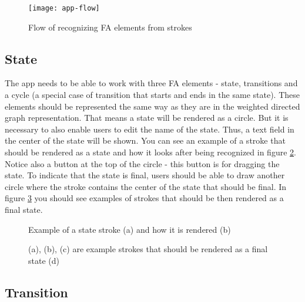 \begin{figure}
    \texttt{[image: app-flow]}
    \caption{Flow of recognizing FA elements from strokes}\label{app-flow}
\end{figure}

\subsection{State}

The app needs to be able to work with three FA elements - state, transitions and a cycle (a special case of transition that starts and ends in the same state). These elements should be represented the same way as they are in the weighted directed graph representation. That means a state will be rendered as a circle. But it is necessary to also enable users to edit the name of the state. Thus, a text field in the center of the state will be shown. You can see an example of a stroke that should be rendered as a state and how it looks after being recognized in figure \ref{state}. Notice also a button at the top of the circle - this button is for dragging the state. To indicate that the state is final, users should be able to draw another circle where the stroke contains the center of the state that should be final. In figure \ref{final-state} you should see examples of strokes that should be then rendered as a final state.

\begin{figure}
    \centering
    \caption{Example of a state stroke (a) and how it is rendered (b)}\label{state}
\end{figure}

\begin{figure}
    \centering
    \caption{(a), (b), (c) are example strokes that should be rendered as a final state (d)}\label{final-state}
\end{figure}

\subsection{Transition}

